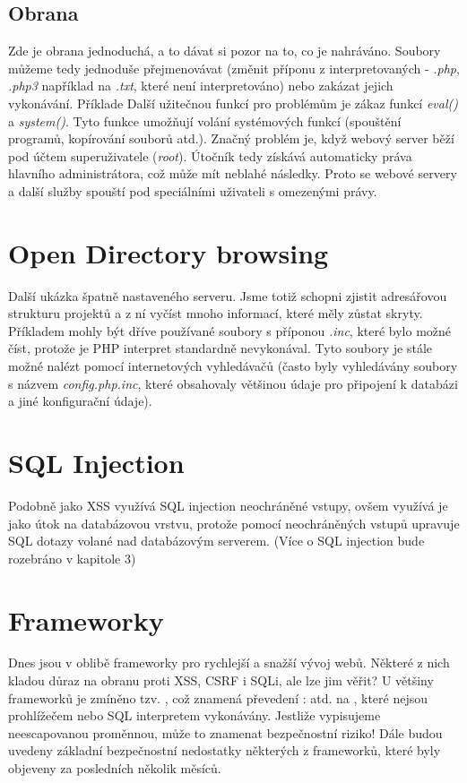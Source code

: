 \subsection{Obrana}
Zde je obrana jednoduchá, a to dávat si pozor na to, co je nahráváno. Soubory můžeme tedy jednoduše přejmenovávat (změnit příponu z interpretovaných - \textit{.php}, \textit{.php3}  například na \textit{.txt}, které není interpretováno) nebo zakázat jejich vykonávání. Příklade Další užitečnou funkcí pro  problémům je zákaz funkcí \textit{eval()} a \textit{system()}. Tyto funkce umožňují volání systémových funkcí (spouštění programů, kopírování souborů atd.). Značný problém je, když webový server běží pod účtem superuživatele (\textit{root}). Útočník tedy získává automaticky práva hlavního administrátora, což může mít neblahé následky. Proto se webové servery a další služby spouští pod speciálními uživateli s omezenými právy.

\section{Open Directory browsing}
Další ukázka špatně nastaveného serveru. Jsme totiž schopni zjistit adresářovou strukturu projektů a z ní vyčíst mnoho informací, které měly zůstat skryty. Příkladem mohly být dříve používané soubory s příponou \textit{.inc}, které bylo možné číst, protože je PHP interpret standardně nevykonával. Tyto soubory je stále možné nalézt pomocí internetových vyhledávačů (často byly vyhledávány soubory s názvem \textit{config.php.inc}, které obsahovaly většinou údaje pro připojení k databázi a jiné konfigurační údaje).

\section{SQL Injection}
Podobně jako XSS využívá SQL injection neochráněné vstupy, ovšem využívá je jako útok na databázovou vrstvu, protože pomocí neochráněných vstupů upravuje SQL dotazy volané nad databázovým serverem. (Více o SQL injection bude rozebráno v kapitole 3)

\section{Frameworky}
Dnes jsou v oblibě frameworky pro rychlejší a snažší vývoj webů. Některé z nich kladou důraz na obranu proti XSS, CSRF i SQLi, ale lze jim věřit? U většiny frameworků je zmíněno tzv. , což znamená převedení : \uv{<>\"} atd. na , které nejsou prohlížečem nebo SQL interpretem vykonávány. Jestliže vypisujeme neescapovanou proměnnou, může to znamenat bezpečnostní riziko! Dále budou uvedeny základní bezpečnostní nedostatky některých z frameworků, které byly objeveny za posledních několik měsíců.

